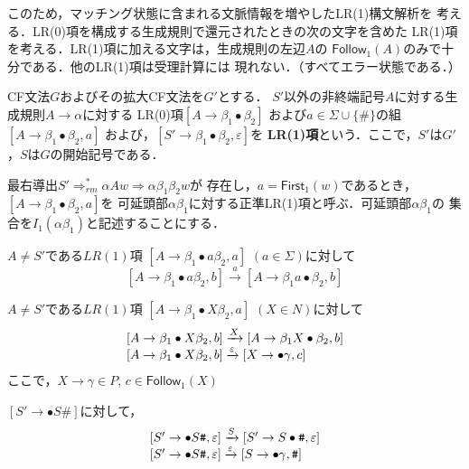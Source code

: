 \documentclass[dvipdfmx,a4j]{jbook}
\begin{document}
このため，マッチング状態に含まれる文脈情報を増やしたLR(1)構文解析を
考える．LR(0)項を構成する生成規則で還元されたときの次の文字を含めた
LR(1)項を考える．LR(1)項に加える文字は，生成規則の左辺$A$の
$\mathsf{Follow}_1(A)$のみで十分である．他のLR(1)項は受理計算には
現れない．（すべてエラー状態である．）

\begin{Def}
  CF文法$G$およびその拡大CF文法を$G'$とする．
  $S'$以外の非終端記号$A$に対する生成規則$A\rightarrow\alpha$に対する
  LR(0)項$[A\rightarrow\beta_1\bullet\beta_2]$
および$a\in\Sigma\cup\{\texttt{\#}\}$の組$[A\rightarrow\beta_1\bullet\beta_2,a]$
および，$[S'\rightarrow\beta_1\bullet\beta_2,\varepsilon]$を
{\bf LR(1)項}という．ここで，$S'$は$G'$，$S$は$G$の開始記号である．
\end{Def}

\begin{Def}
  最右導出$S'\Rightarrow^\ast_{rm}\alpha A w\Rightarrow \alpha\beta_1\beta_2 w$が
  存在し，$a=\mathsf{First}_1(w)$であるとき，$[A\rightarrow\beta_1\bullet\beta_2,a]$を
  可延頭部$\alpha\beta_1$に対する正準LR(1)項と呼ぶ．可延頭部$\alpha\beta_1$の
  集合を$I_1(\alpha\beta_1)$と記述することにする．
\end{Def}

\begin{Def}
  \begin{list}{}{}
    \item[(1)] $A\not=S'$である$LR(1)$項 $[A\rightarrow\beta_1\bullet a\beta_2,a]$ $(a\in\Sigma)$に対して
    \[[A\rightarrow\beta_1\bullet a\beta_2,b]\xrightarrow{a}[A\rightarrow\beta_1 a\bullet\beta_2,b]\]
    \item[(2)] $A\not=S'$である$LR(1)$項 $[A\rightarrow\beta_1\bullet X\beta_2,a]$ $(X\in N)$に対して
    \[\begin{array}{l}
      [A\rightarrow\beta_1\bullet X\beta_2,b]\xrightarrow{X}[A\rightarrow\beta_1 X\bullet\beta_2,b]\\\relax
      [A\rightarrow\beta_1\bullet X\beta_2,b]\xrightarrow{\varepsilon}[X\rightarrow\bullet\gamma,c]
    \end{array}\]
    ここで，$X\rightarrow\gamma\in P$, $c\in\mathsf{Follow}_1(X)$
    \item[(3)] $[S'\rightarrow\bullet S\texttt{\#}]$に対して，
    \[\begin{array}{l}
      [S'\rightarrow\bullet S\texttt{\#},\varepsilon]\xrightarrow{S}[S'\rightarrow S\bullet\texttt{\#},\varepsilon]\\\relax
      [S'\rightarrow\bullet S\texttt{\#},\varepsilon]\xrightarrow{\varepsilon}
      [S\rightarrow\bullet\gamma,\texttt{\#}]
    \end{array}\]
  \end{list}
\end{Def}
\end{document}
